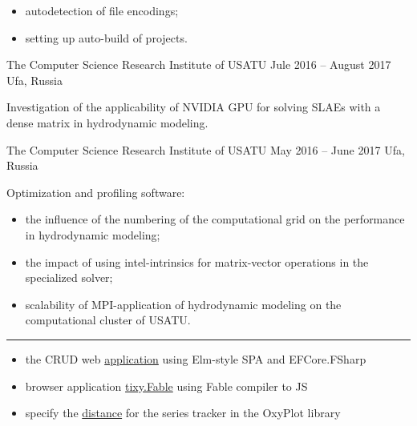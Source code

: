 \documentclass[10pt,a4paper,ragged2e,withhyper]{altacv}
\begin{document}
\begin{paracol}{2}
\begin{itemize}
  \item autodetection of file encodings;
  \smallskip

  \item setting up auto-build of projects.

\end{itemize}

\divider

{The Computer Science Research Institute of USATU}
{Jule 2016 -- August 2017}
{Ufa, Russia}

Investigation of the applicability of NVIDIA GPU for solving SLAEs with a dense matrix in hydrodynamic modeling.

\divider

{The Computer Science Research Institute of USATU}
{May 2016 -- June 2017}
{Ufa, Russia}

Optimization and profiling software:

\begin{itemize}

  \item the influence of the numbering of the computational grid on the performance in hydrodynamic modeling;
  \smallskip

  \item the impact of using intel-intrinsics for matrix-vector operations in the specialized solver;
  \smallskip

  \item scalability of MPI-application of hydrodynamic modeling on the computational cluster of USATU.

\end{itemize}

{\color{headingrule}\rule{\linewidth}{1pt}\par}\medskip


\smallskip

\begin{itemize}

  \item the CRUD web
  \href{https://github.com/rstm-sf/ClientServerCRUD}{application}
  using Elm-style SPA and EFCore.FSharp
  \smallskip

  \item browser application
  \href{https://github.com/rstm-sf/tixy.Fable}{tixy.Fable}
  using Fable compiler to JS
  \smallskip

  \item specify the
  \href{https://github.com/oxyplot/oxyplot/pull/1736}{distance}
  for the series tracker in the OxyPlot library
  \smallskip


\end{itemize}
\end{paracol}
\end{document}
